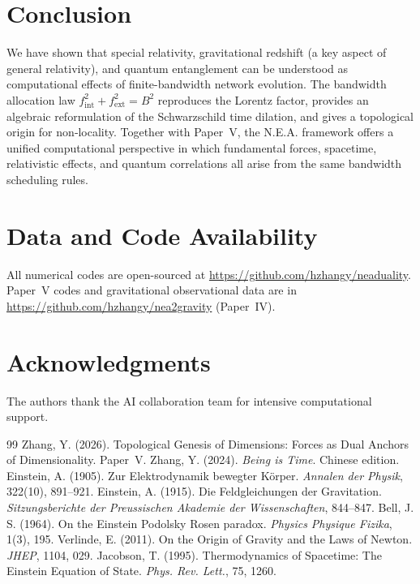 \documentclass[12pt,a4paper]{article}
\begin{document}
\section{Conclusion}
We have shown that special relativity, gravitational redshift (a key aspect of general relativity), and quantum entanglement can be understood as computational effects of finite-bandwidth network evolution. The bandwidth allocation law $f_{\text{int}}^2 + f_{\text{ext}}^2 = B^2$ reproduces the Lorentz factor, provides an algebraic reformulation of the Schwarzschild time dilation, and gives a topological origin for non‑locality. Together with Paper~V, the N.E.A. framework offers a unified computational perspective in which fundamental forces, spacetime, relativistic effects, and quantum correlations all arise from the same bandwidth scheduling rules.

\section*{Data and Code Availability}
All numerical codes are open-sourced at \url{https://github.com/hzhangy/neaduality}. Paper~V codes and gravitational observational data are in \url{https://github.com/hzhangy/nea2gravity} (Paper~IV).

\section*{Acknowledgments}
The authors thank the AI collaboration team for intensive computational support.

\begin{thebibliography}{99}
 Zhang, Y. (2026). Topological Genesis of Dimensions: Forces as Dual Anchors of Dimensionality. Paper~V.
 Zhang, Y. (2024). \textit{Being is Time}. Chinese edition.
 Einstein, A. (1905). Zur Elektrodynamik bewegter Körper. \textit{Annalen der Physik}, 322(10), 891–921.
 Einstein, A. (1915). Die Feldgleichungen der Gravitation. \textit{Sitzungsberichte der Preussischen Akademie der Wissenschaften}, 844–847.
 Bell, J. S. (1964). On the Einstein Podolsky Rosen paradox. \textit{Physics Physique Fizika}, 1(3), 195.
 Verlinde, E. (2011). On the Origin of Gravity and the Laws of Newton. \textit{JHEP}, 1104, 029.
 Jacobson, T. (1995). Thermodynamics of Spacetime: The Einstein Equation of State. \textit{Phys. Rev. Lett.}, 75, 1260.
\end{thebibliography}
\end{document}
